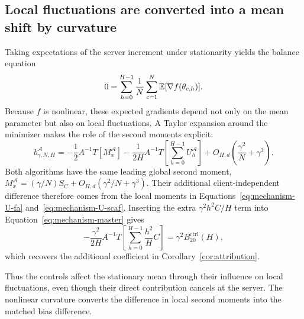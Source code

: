 \subsection{Local fluctuations are converted into a mean shift by curvature}

Taking expectations of the server increment under stationarity yields the balance equation
\begin{equation}
\label{eq:mechanism-balance}
0=\sum_{h=0}^{H-1}\frac1N\sum_{c=1}^N\mathbb{E}[\nabla f(\theta_{c,h})].
\end{equation}
Because $f$ is nonlinear, these expected gradients depend not only on the mean parameter but also on local fluctuations. A Taylor expansion around the minimizer makes the role of the second moments explicit:
\begin{equation}
\label{eq:mechanism-master}
b^{\mathcal A}_{\gamma,N,H}
=-\frac12A^{-1}T[M_x^{\mathcal A}]
-\frac1{2H}A^{-1}T\!\left[\sum_{h=0}^{H-1}U_h^{\mathcal A}\right]
+O_{H,d}\!\left(\frac{\gamma^2}{N}+\gamma^3\right).
\end{equation}
Both algorithms have the same leading global second moment,
$M_x^{\mathcal A}=(\gamma/N)S_C+O_{H,d}(\gamma^2/N+\gamma^3)$.
Their additional client-independent difference therefore comes from the local moments in Equations~\eqref{eq:mechanism-U-fa} and~\eqref{eq:mechanism-U-scaf}. Inserting the extra $\gamma^2h^2C/H$ term into Equation~\eqref{eq:mechanism-master} gives
\[
-\frac{\gamma^2}{2H}A^{-1}T\!\left[\sum_{h=0}^{H-1}\frac{h^2}{H}C\right]
=\gamma^2B_{20}^{\mathrm{ctrl}}(H),
\]
which recovers the additional coefficient in Corollary~\ref{cor:attribution}.

Thus the controls affect the stationary mean through their influence on local fluctuations, even though their direct contribution cancels at the server. The nonlinear curvature converts the difference in local second moments into the matched bias difference.
